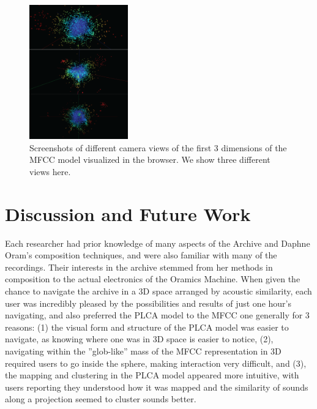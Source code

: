 \begin{figure}
  \centering
 \includegraphics[width=0.38\textwidth]{images/mfcc-all.png}
  \caption{Screenshots of different camera views of the first 3 dimensions of the MFCC model visualized in the browser.  We show three different views here.}
  \label{fig:mfcc}
\end{figure}



\section{Discussion and Future Work}\label{discussion}

Each researcher had prior knowledge of many aspects of the Archive and Daphne Oram's composition techniques, and were also familiar with many of the recordings.  Their interests in the archive stemmed from her methods in composition to the actual electronics of the Oramics Machine.  When given the chance to navigate the archive in a 3D space arranged by acoustic similarity, each user was incredibly pleased by the possibilities and results of just one hour's navigating, and also preferred the PLCA model to the MFCC one generally for 3 reasons: (1) the visual form and structure of the PLCA model was easier to navigate, as knowing where one was in 3D space is easier to notice, (2), navigating within the ''glob-like'' mass of the MFCC representation in 3D required users to go inside the sphere, making interaction very difficult, and (3), the mapping and clustering in the PLCA model appeared more intuitive, with users reporting they understood how it was mapped and the similarity of sounds along a projection seemed to cluster sounds better.  

